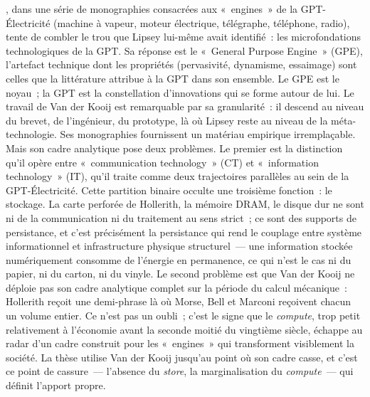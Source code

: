 \textcite{vanderkooij_invention_2015}, dans une série de monographies consacrées aux «~engines~» de la GPT-Électricité (machine à vapeur, moteur électrique, télégraphe, téléphone, radio), tente de combler le trou que Lipsey lui-même avait identifié~: les microfondations technologiques de la GPT. Sa réponse est le «~General Purpose Engine~» (GPE), l'artefact technique dont les propriétés (pervasivité, dynamisme, essaimage) sont celles que la littérature attribue à la GPT dans son ensemble. Le GPE est le noyau~; la GPT est la constellation d'innovations qui se forme autour de lui. Le travail de Van der Kooij est remarquable par sa granularité~: il descend au niveau du brevet, de l'ingénieur, du prototype, là où Lipsey reste au niveau de la méta-technologie. Ses monographies fournissent un matériau empirique irremplaçable. Mais son cadre analytique pose deux problèmes. Le premier est la distinction qu'il opère entre «~communication technology~» (CT) et «~information technology~» (IT), qu'il traite comme deux trajectoires parallèles au sein de la GPT-Électricité. Cette partition binaire occulte une troisième fonction~: le stockage. La carte perforée de Hollerith, la mémoire DRAM, le disque dur ne sont ni de la communication ni du traitement au sens strict~; ce sont des supports de persistance, et c'est précisément la persistance qui rend le couplage entre système informationnel et infrastructure physique structurel~--- une information stockée numériquement consomme de l'énergie en permanence, ce qui n'est le cas ni du papier, ni du carton, ni du vinyle. Le second problème est que Van der Kooij ne déploie pas son cadre analytique complet sur la période du calcul mécanique~: Hollerith reçoit une demi-phrase là où Morse, Bell et Marconi reçoivent chacun un volume entier. Ce n'est pas un oubli~; c'est le signe que le \emph{compute}, trop petit relativement à l'économie avant la seconde moitié du vingtième siècle, échappe au radar d'un cadre construit pour les «~engines~» qui transforment visiblement la société. La thèse utilise Van der Kooij jusqu'au point où son cadre casse, et c'est ce point de cassure~--- l'absence du \emph{store}, la marginalisation du \emph{compute}~--- qui définit l'apport propre.

